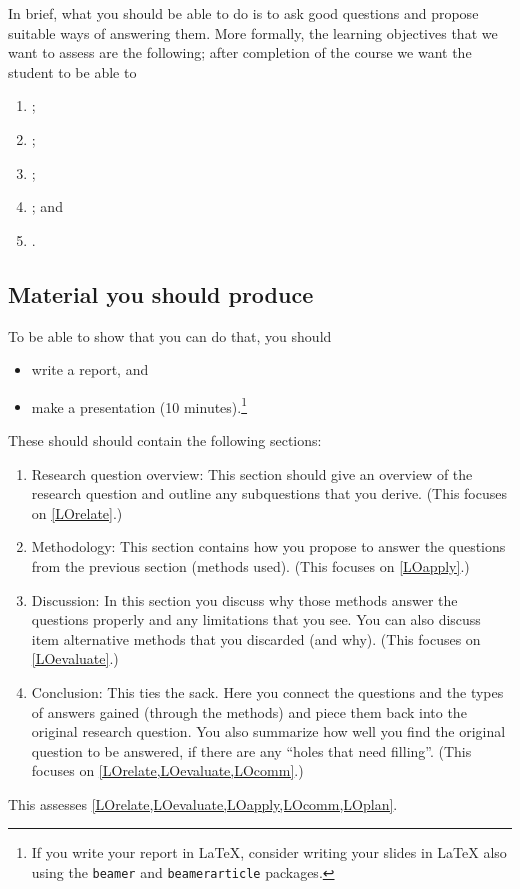 In brief, what you should be able to do is to ask good questions and propose 
suitable ways of answering them.
More formally, the learning objectives that we want to assess are the 
following; after completion of the course we want the student to be able to
\begin{enumerate}[label={(LO\arabic*)},ref=LO\arabic*]
  \item \LOrelate*;
  \item \LOevaluate*;
  \item \LOapply*;
  \item \LOplan*; and
  \item \LOcomm*.
\end{enumerate}

\subsection{Material you should produce}

To be able to show that you can do that, you should
\begin{itemize}
  \item write a report, and
  \item make a presentation (10 minutes).\footnote{%
      If you write your report in LaTeX, consider writing your slides in LaTeX 
      also using the \texttt{beamer} and \texttt{beamerarticle} packages.
    }
\end{itemize}
These should should contain the following sections:
\begin{enumerate}
  \item Research question overview:
    This section should give an overview of the research question and outline 
    any subquestions that you derive.
    (This focuses on \cref{LOrelate}.)
  \item Methodology:
    This section contains how you propose to answer the questions from the 
    previous section (methods used).
    (This focuses on \cref{LOapply}.)
  \item Discussion:
    In this section you discuss why those methods answer the questions properly 
    and any limitations that you see.
    You can also discuss item alternative methods that you discarded (and 
    why).
    (This focuses on \cref{LOevaluate}.)
  \item Conclusion:
    This ties the sack.
    Here you connect the questions and the types of answers gained (through the 
    methods) and piece them back into the original research question.
    You also summarize how well you find the original question to be answered, 
    if there are any \enquote{holes that need filling}.
    (This focuses on \cref{LOrelate,LOevaluate,LOcomm}.)
\end{enumerate}
This assesses \cref{LOrelate,LOevaluate,LOapply,LOcomm,LOplan}.


